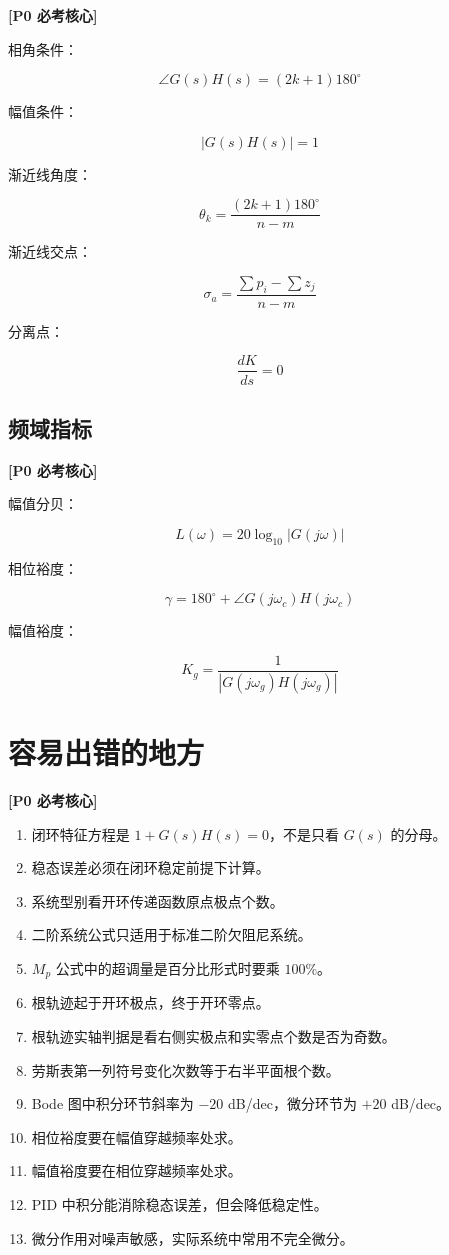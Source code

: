 \documentclass[UTF8,a4paper,12pt]{ctexart}
\newcommand{\Pzero}{\textcolor{p0}{\textbf{[P0 必考核心]}}}
\begin{document}
\Pzero

相角条件：

\[
\angle G(s)H(s)=(2k+1)180^\circ
\]

幅值条件：

\[
|G(s)H(s)|=1
\]

渐近线角度：

\[
\theta_k=\frac{(2k+1)180^\circ}{n-m}
\]

渐近线交点：

\[
\sigma_a=\frac{\sum p_i-\sum z_j}{n-m}
\]

分离点：

\[
\frac{dK}{ds}=0
\]

\subsection{频域指标}

\Pzero

幅值分贝：

\[
L(\omega)=20\log_{10}|G(j\omega)|
\]

相位裕度：

\[
\gamma=180^\circ+\angle G(j\omega_c)H(j\omega_c)
\]

幅值裕度：

\[
K_g=\frac{1}{|G(j\omega_g)H(j\omega_g)|}
\]

\section{容易出错的地方}

\Pzero

\begin{enumerate}
    \item 闭环特征方程是 $1+G(s)H(s)=0$，不是只看 $G(s)$ 的分母。
    \item 稳态误差必须在闭环稳定前提下计算。
    \item 系统型别看开环传递函数原点极点个数。
    \item 二阶系统公式只适用于标准二阶欠阻尼系统。
    \item $M_p$ 公式中的超调量是百分比形式时要乘 $100\%$。
    \item 根轨迹起于开环极点，终于开环零点。
    \item 根轨迹实轴判据是看右侧实极点和实零点个数是否为奇数。
    \item 劳斯表第一列符号变化次数等于右半平面根个数。
    \item Bode 图中积分环节斜率为 $-20$ dB/dec，微分环节为 $+20$ dB/dec。
    \item 相位裕度要在幅值穿越频率处求。
    \item 幅值裕度要在相位穿越频率处求。
    \item PID 中积分能消除稳态误差，但会降低稳定性。
    \item 微分作用对噪声敏感，实际系统中常用不完全微分。
\end{enumerate}
\end{document}
